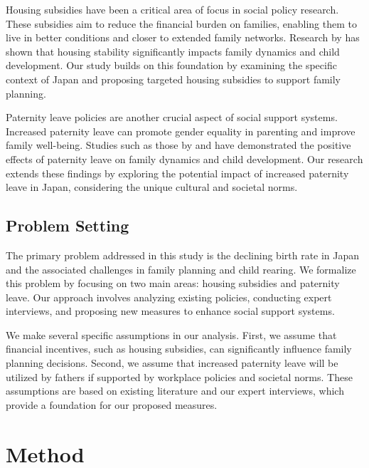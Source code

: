 \documentclass{article} %
\begin{document}
Housing subsidies have been a critical area of focus in social policy research. These subsidies aim to reduce the financial burden on families, enabling them to live in better conditions and closer to extended family networks. Research by \citet{zhou2023peer} has shown that housing stability significantly impacts family dynamics and child development. Our study builds on this foundation by examining the specific context of Japan and proposing targeted housing subsidies to support family planning.

Paternity leave policies are another crucial aspect of social support systems. Increased paternity leave can promote gender equality in parenting and improve family well-being. Studies such as those by \citet{liu2023agentbench} and \citet{west2023agent} have demonstrated the positive effects of paternity leave on family dynamics and child development. Our research extends these findings by exploring the potential impact of increased paternity leave in Japan, considering the unique cultural and societal norms.

\subsection{Problem Setting}
\label{sec:problem_setting}
The primary problem addressed in this study is the declining birth rate in Japan and the associated challenges in family planning and child rearing. We formalize this problem by focusing on two main areas: housing subsidies and paternity leave. Our approach involves analyzing existing policies, conducting expert interviews, and proposing new measures to enhance social support systems.

We make several specific assumptions in our analysis. First, we assume that financial incentives, such as housing subsidies, can significantly influence family planning decisions. Second, we assume that increased paternity leave will be utilized by fathers if supported by workplace policies and societal norms. These assumptions are based on existing literature and our expert interviews, which provide a foundation for our proposed measures.

\section{Method}
\label{sec:method}
\end{document}
